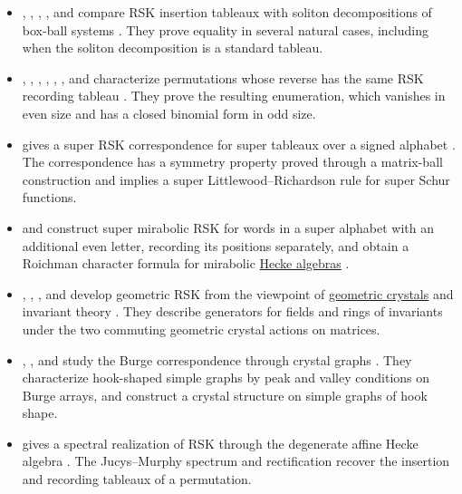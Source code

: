 \begin{itemize}
\item {}, , ,
, and  compare RSK insertion tableaux
with soliton decompositions of box-ball systems \cite{DruckerGarciaGunawanRumboltSilver2023}.
They prove equality in several natural cases, including when the soliton
decomposition is a standard tableau.

\item {}, , ,
, , , and
 characterize permutations whose reverse has the same
RSK recording tableau \cite{ErvinJacksonLaneLeeNguyenODonohueVaughan2021x}.
They prove the resulting enumeration, which vanishes in even size and has a
closed binomial form in odd size.

\item {} gives a super RSK correspondence for super tableaux
over a signed alphabet \cite{Hage2022x}.  The correspondence has a symmetry
property proved through a matrix-ball construction and implies a super
Littlewood--Richardson rule for super Schur functions.

\item {} and  construct super mirabolic RSK
for words in a super alphabet with an additional even letter, recording its
positions separately, and obtain a Roichman character formula for mirabolic
\hyperref[heckeAlgebra]{Hecke algebras} \cite{JingLiu2026Mirabolic}.

\item {}, ,
, and  develop geometric RSK
from the viewpoint of \hyperref[crystals]{geometric crystals} and invariant theory
\cite{BrubakerFriedenPylyavskyyScrimshaw2025GeoRSK}.  They describe
generators for fields and rings of invariants under the two commuting
geometric crystal actions on matrices.

\item {}, , and 
study the Burge correspondence through crystal graphs \cite{PappePaulSchilling2023}.
They characterize hook-shaped simple graphs by peak and valley conditions on
Burge arrays, and construct a crystal structure on simple graphs of hook
shape.

\item {} gives a spectral realization of RSK through the
degenerate affine Hecke algebra \cite{Stern2026x}.  The Jucys--Murphy
spectrum and rectification recover the insertion and recording tableaux of a
permutation.


\end{itemize}
